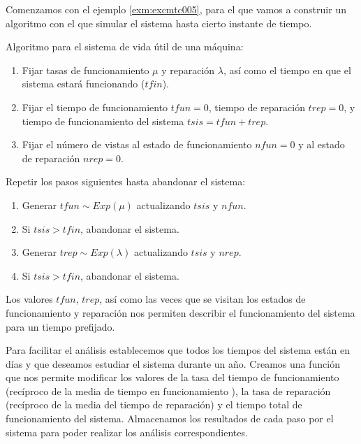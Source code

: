 \documentclass[
]{book}
\providecommand{\tightlist}{%
  \setlength{\itemsep}{0pt}\setlength{\parskip}{0pt}}
\newenvironment{silverbox}{
  \definecolor{shadecolor}{rgb}{192, 192, 192}  
  \color{black}
  \begin{shaded}}
 {\end{shaded}}
\theoremstyle{definition}
\theoremstyle{definition}
\theoremstyle{definition}
\theoremstyle{definition}
\theoremstyle{remark}
\begin{document}
Comenzamos con el ejemplo \ref{exm:excmtc005}, para el que vamos a construir un algoritmo con el que simular el sistema hasta cierto instante de tiempo.

\begin{silverbox}
Algoritmo para el sistema de vida útil de una máquina:

\begin{enumerate}
\def\labelenumi{\arabic{enumi}.}
\tightlist
\item
  Fijar tasas de funcionamiento \(\mu\) y reparación \(\lambda\), así como el tiempo en que el sistema estará funcionando (\(tfin\)).
\item
  Fijar el tiempo de funcionamiento \(tfun = 0\), tiempo de reparación \(trep = 0\), y tiempo de funcionamiento del sistema \(tsis = tfun + trep\).
\item
  Fijar el número de vistas al estado de funcionamiento \(nfun = 0\) y al estado de reparación \(nrep =0\).
\end{enumerate}

Repetir los pasos siguientes hasta abandonar el sistema:

\begin{enumerate}
\def\labelenumi{\arabic{enumi}.}
\setcounter{enumi}{2}
\tightlist
\item
  Generar \(tfun \sim Exp(\mu)\) actualizando \(tsis\) y \(nfun\).
\item
  Si \(tsis > tfin\), abandonar el sistema.
\item
  Generar \(trep \sim Exp(\lambda)\) actualizando \(tsis\) y \(nrep\).
\item
  Si \(tsis > tfin\), abandonar el sistema.
\end{enumerate}

Los valores \(tfun\), \(trep\), así como las veces que se visitan los estados de funcionamiento y reparación nos permiten describir el funcionamiento del sistema para un tiempo prefijado.

\end{silverbox}

Para facilitar el análisis establecemos que todos los tiempos del sistema están en días y que deseamos estudiar el sistema durante un año. Creamos una función que nos permite modificar los valores de la tasa del tiempo de funcionamiento (recíproco de la media de tiempo en funcionamiento ), la tasa de reparación (recíproco de la media del tiempo de reparación) y el tiempo total de funcionamiento del sistema. Almacenamos los resultados de cada paso por el sistema para poder realizar los análisis correspondientes.
\end{document}
